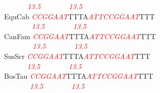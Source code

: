 \documentclass[11pt,twoside,reqno,a4paper]{article}
\begin{document}
{\textcolor{white}{CalJac	}\textit{\textcolor{red}{13.5}}\ \ \ \ \ \ \ \ \textit{\textcolor{red}{13.5}}\ \ \ \ \ \ \ \ \ \ \\
EquCab	\textit{\textcolor{red}{C}}\textit{\textcolor{red}{C}}\textit{\textcolor{red}{G}}\textit{\textcolor{red}{G}}\textit{\textcolor{red}{A}}\textit{\textcolor{red}{A}}\textit{\textcolor{red}{T}}TTTA\textit{\textcolor{red}{A}}\textit{\textcolor{red}{T}}\textit{\textcolor{red}{T}}\textit{\textcolor{red}{C}}\textit{\textcolor{red}{C}}\textit{\textcolor{red}{G}}\textit{\textcolor{red}{G}}\textit{\textcolor{red}{A}}\textit{\textcolor{red}{A}}\textit{\textcolor{red}{T}}TTT\\
\textcolor{white}{EquCab	}\textit{\textcolor{red}{13.5}}\ \ \ \ \ \ \ \ \textit{\textcolor{red}{13.5}}\ \ \ \ \ \ \ \ \ \ \\
CanFam	\textit{\textcolor{red}{C}}\textit{\textcolor{red}{C}}\textit{\textcolor{red}{G}}\textit{\textcolor{red}{G}}\textit{\textcolor{red}{A}}\textit{\textcolor{red}{A}}\textit{\textcolor{red}{T}}TTTA\textit{\textcolor{red}{A}}\textit{\textcolor{red}{T}}\textit{\textcolor{red}{T}}\textit{\textcolor{red}{C}}\textit{\textcolor{red}{C}}\textit{\textcolor{red}{G}}\textit{\textcolor{red}{G}}\textit{\textcolor{red}{A}}\textit{\textcolor{red}{A}}\textit{\textcolor{red}{T}}TTT\\
\textcolor{white}{CanFam	}\textit{\textcolor{red}{13.5}}\ \ \ \ \ \ \ \ \textit{\textcolor{red}{13.5}}\ \ \ \ \ \ \ \ \ \ \\
SusScr	\textit{\textcolor{red}{C}}\textit{\textcolor{red}{C}}\textit{\textcolor{red}{G}}\textit{\textcolor{red}{G}}\textit{\textcolor{red}{A}}\textit{\textcolor{red}{A}}\textit{\textcolor{red}{T}}TTTA\textit{\textcolor{red}{A}}\textit{\textcolor{red}{T}}\textit{\textcolor{red}{T}}\textit{\textcolor{red}{C}}\textit{\textcolor{red}{C}}\textit{\textcolor{red}{G}}\textit{\textcolor{red}{G}}\textit{\textcolor{red}{A}}\textit{\textcolor{red}{A}}\textit{\textcolor{red}{T}}TTT\\
\textcolor{white}{SusScr	}\textit{\textcolor{red}{13.5}}\ \ \ \ \ \ \ \ \textit{\textcolor{red}{13.5}}\ \ \ \ \ \ \ \ \ \ \\
BosTau	\textit{\textcolor{red}{C}}\textit{\textcolor{red}{C}}\textit{\textcolor{red}{G}}\textit{\textcolor{red}{G}}\textit{\textcolor{red}{A}}\textit{\textcolor{red}{A}}\textit{\textcolor{red}{T}}TTTA\textit{\textcolor{red}{A}}\textit{\textcolor{red}{T}}\textit{\textcolor{red}{T}}\textit{\textcolor{red}{C}}\textit{\textcolor{red}{C}}\textit{\textcolor{red}{G}}\textit{\textcolor{red}{G}}\textit{\textcolor{red}{A}}\textit{\textcolor{red}{A}}\textit{\textcolor{red}{T}}TTT\\
\textcolor{white}{BosTau	}\textit{\textcolor{red}{13.5}}\ \ \ \ \ \ \ \ \textit{\textcolor{red}{13.5}}\ \ \ \ \ \ \ \ \ \ \\
\\
}
\end{document}
